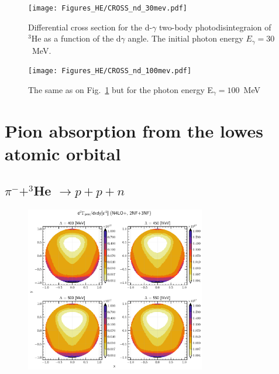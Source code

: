 \begin{figure}[h]
    \begin{center}
        \texttt{[image: Figures\_HE/CROSS\_nd\_30mev.pdf]}
        \end{center}
        \caption{Differential cross section for the d-$\gamma$ 
        two-body photodisintegraion of $^3$He as a function of the d$\gamma$ angle.
        The initial photon energy $E_\gamma=30$~MeV.}
        \label{CROSS_nd_30}
    \end{figure}


    \begin{figure}[h]
        \begin{center}
        \texttt{[image: Figures\_HE/CROSS\_nd\_100mev.pdf]}
        \end{center}
        \caption{The same as on Fig.~\ref{CROSS_nd_30} but 
        for the photon energy E$_\gamma=100$~MeV}
        \label{CROSS_nd_100}
    \end{figure}

    \clearpage
    \section{Pion absorption from the lowes atomic orbital}

    \subsection{$\pi^- + ^3$He $\rightarrow p + p + n$}

    \begin{figure}[h]
        \begin{center}
        \includegraphics[width=0.7\textwidth]{PlotData/PION/Dalitz_maps/figures/Dalitz_map_pnn_xy_cutofs.pdf}
        \end{center}
        \caption{}
        \label{pion_map_xy_cutoff}
    \end{figure}

